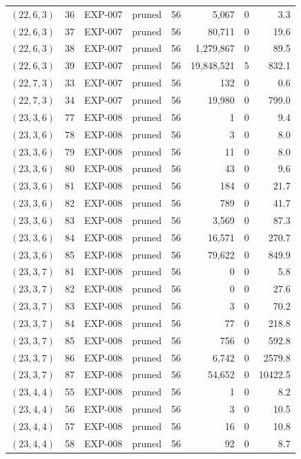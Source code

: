 \begin{longtable}{lrllrrrr}
$(22,6,3)$ & 36 & EXP-007 & pruned & 56 & 5{,}067 & 0 & 3.3 \\
$(22,6,3)$ & 37 & EXP-007 & pruned & 56 & 80{,}711 & 0 & 19.6 \\
$(22,6,3)$ & 38 & EXP-007 & pruned & 56 & 1{,}279{,}867 & 0 & 89.5 \\
$(22,6,3)$ & 39 & EXP-007 & pruned & 56 & 19{,}848{,}521 & 5 & 832.1 \\
$(22,7,3)$ & 33 & EXP-007 & pruned & 56 & 132 & 0 & 0.6 \\
$(22,7,3)$ & 34 & EXP-007 & pruned & 56 & 19{,}980 & 0 & 799.0 \\
$(23,3,6)$ & 77 & EXP-008 & pruned & 56 & 1 & 0 & 9.4 \\
$(23,3,6)$ & 78 & EXP-008 & pruned & 56 & 3 & 0 & 8.0 \\
$(23,3,6)$ & 79 & EXP-008 & pruned & 56 & 11 & 0 & 8.0 \\
$(23,3,6)$ & 80 & EXP-008 & pruned & 56 & 43 & 0 & 9.6 \\
$(23,3,6)$ & 81 & EXP-008 & pruned & 56 & 184 & 0 & 21.7 \\
$(23,3,6)$ & 82 & EXP-008 & pruned & 56 & 789 & 0 & 41.7 \\
$(23,3,6)$ & 83 & EXP-008 & pruned & 56 & 3{,}569 & 0 & 87.3 \\
$(23,3,6)$ & 84 & EXP-008 & pruned & 56 & 16{,}571 & 0 & 270.7 \\
$(23,3,6)$ & 85 & EXP-008 & pruned & 56 & 79{,}622 & 0 & 849.9 \\
$(23,3,7)$ & 81 & EXP-008 & pruned & 56 & 0 & 0 & 5.8 \\
$(23,3,7)$ & 82 & EXP-008 & pruned & 56 & 0 & 0 & 27.6 \\
$(23,3,7)$ & 83 & EXP-008 & pruned & 56 & 3 & 0 & 70.2 \\
$(23,3,7)$ & 84 & EXP-008 & pruned & 56 & 77 & 0 & 218.8 \\
$(23,3,7)$ & 85 & EXP-008 & pruned & 56 & 756 & 0 & 592.8 \\
$(23,3,7)$ & 86 & EXP-008 & pruned & 56 & 6{,}742 & 0 & 2579.8 \\
$(23,3,7)$ & 87 & EXP-008 & pruned & 56 & 54{,}652 & 0 & 10422.5 \\
$(23,4,4)$ & 55 & EXP-008 & pruned & 56 & 1 & 0 & 8.2 \\
$(23,4,4)$ & 56 & EXP-008 & pruned & 56 & 3 & 0 & 10.5 \\
$(23,4,4)$ & 57 & EXP-008 & pruned & 56 & 16 & 0 & 10.8 \\
$(23,4,4)$ & 58 & EXP-008 & pruned & 56 & 92 & 0 & 8.7 \\

\end{longtable}
